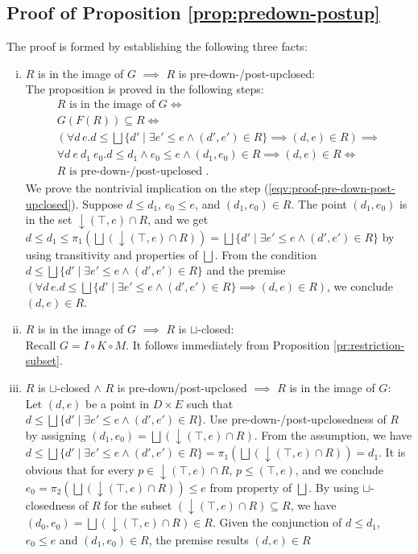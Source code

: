 \documentclass{llncs}
\newcommand{\join}{\sqcup}
\newcommand{\bigjoin}{\bigsqcup}
\newcommand{\comp}{\circ}
\begin{document}
\subsection{Proof of Proposition \ref{prop:predown-postup}}
The proof is formed by establishing the following three facts:
\begin{enumerate}[i.]
\item{$R$ is in the image of $G$ $\implies$ $R$ is pre-down-/post-upclosed:}\\
  The proposition is proved in the following steps:
  \begin{align*}
    R \text{ is in the image of } G \iff \\
    G(F(R)) \subseteq R \iff \\
    (\forall d\, e . d \leq \bigjoin \{ d' \mid \exists e' \leq e \land (d', e') \in R \} \implies (d , e) \in R) \implies \tag{*}\label{eqv:proof-pre-down-post-upclosed} \\
    \forall d\ e\ d_{1 }\ e_{0}. d \leq d_{1} \land e_{0} \leq e \land (d_{1}, e_{0}) \in R \implies (d, e) \in R \iff \\
    R \text{ is pre-down-/post-upclosed }.
  \end{align*}
  We prove the nontrivial implication on the step (\ref{eqv:proof-pre-down-post-upclosed}).
  Suppose $d \leq d_{1}$, $e_{0} \leq e$, and $(d_{1} , e_{0}) \in R$.
  The point $(d_{1} , e_{0})$ is in the set $\downarrow (\top , e) \cap R$, and we get
  $d \leq d_{1}  \leq \pi_{1} (\bigjoin (\downarrow (\top , e) \cap R)) = \bigjoin \{ d' \mid \exists e' \leq e \land (d', e') \in R \}$
  by using transitivity and properties of $\bigjoin$.
  From the condition $d \leq \bigjoin \{ d' \mid \exists e' \leq e \land (d', e') \in R \}$ and the premise $(\forall d\, e . d \leq \bigjoin \{ d' \mid \exists e' \leq e \land (d', e') \in R \} \implies (d , e) \in R)$, we conclude $(d , e) \in R$.
\item{$R$ is in the image of $G$ $\implies$ $R$ is $\join$-closed:}\\
  Recall $G = I \comp K \comp M$. It follows immediately from Proposition \ref{pr:restriction-subset}.
\item{$R$ is $\join$-closed $\land$ $R$ is pre-down/post-upclosed $\implies$ $R$ is in the image of $G$:}\\
  Let $(d, e)$ be a point in $D \times E$ such that $d \leq \bigjoin \{d' \mid \exists e' \leq e \land (d' , e') \in R \}$.
  Use pre-down-/post-upclosedness of $R$ by assigning $(d_{1}, e_{0}) = \bigjoin (\downarrow (\top , e) \cap R)$.
  From the assumption, we have $d \leq \bigjoin \{d' \mid \exists e' \leq e \land (d' , e') \in R \} = \pi_{1} (\bigjoin (\downarrow (\top , e) \cap R)) = d_{1} $.
  It is obvious that for every $p \in \downarrow (\top , e) \cap R$, $p \leq (\top , e)$, and we conclude $e_{0} = \pi_{2} (\bigjoin (\downarrow (\top , e) \cap R)) \leq e$ from property of $\bigjoin$.  By using $\join$-closedness of $R$ for the subset $(\downarrow (\top , e) \cap R) \subseteq R$, we have $(d_0 , e_0) = \bigjoin (\downarrow (\top , e) \cap R) \in R$.
  Given the conjunction of $d \leq d_{1}$, $e_{0} \leq e$ and $(d_{1} , e_{0}) \in R$, the premise results $(d, e) \in R$
\end{enumerate}
\end{document}
